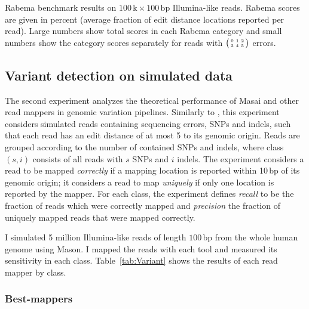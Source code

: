 \begin{table*}[t]
  \caption[Masai results in the Rabema benchmark]
  {
  \label{tab:Rabema}
    Rabema benchmark results on $100\,\text{k}\times 100\,\text{bp}$ Illumina-like reads.
    Rabema scores are given in percent (average fraction of edit distance locations reported per read).
    Large numbers show total scores in each Rabema category and small numbers show the category scores separately for reads with $\bigl(\begin{smallmatrix}\mbox{\tiny 0}&\mbox{\tiny 1}&\mbox{\tiny 2}\\\mbox{\tiny 3}&\mbox{\tiny 4}&\mbox{\tiny 5}\end{smallmatrix}\bigr)$ errors.
    }
  \vspace{-3mm}
  \center
  \sffamily
  \resizebox{0.95\textwidth}{!}
  {
	\renewcommand{\tabcolsep}{0.8ex}
	
  }
\end{table*}

\subsection{Variant detection on simulated data}

The second experiment analyzes the theoretical performance of Masai and other read mappers in genomic variation pipelines.
Similarly to \citep{David2011}, this experiment considers simulated reads containing sequencing errors, SNPs and indels, such that each read has an edit distance of at most 5 to its genomic origin.
Reads are grouped according to the number of contained SNPs and indels, where class $(s,i)$ consists of all reads with $s$ SNPs and $i$ indels.
The experiment considers a read to be mapped \emph{correctly} if a mapping location is reported within 10\,bp of its genomic origin;
it considers a read to map \emph{uniquely} if only one location is reported by the mapper.
For each class, the experiment defines \emph{recall} to be the fraction of reads which were correctly mapped and \emph{precision} the fraction of uniquely mapped reads that were mapped correctly.

I simulated 5 million Illumina-like reads of length $100$\,bp from the whole human genome using Mason.
I mapped the reads with each tool and measured its sensitivity in each class.
Table~\ref{tab:Variant} shows the results of each read mapper by class.

\subsubsection{Best-mappers}

